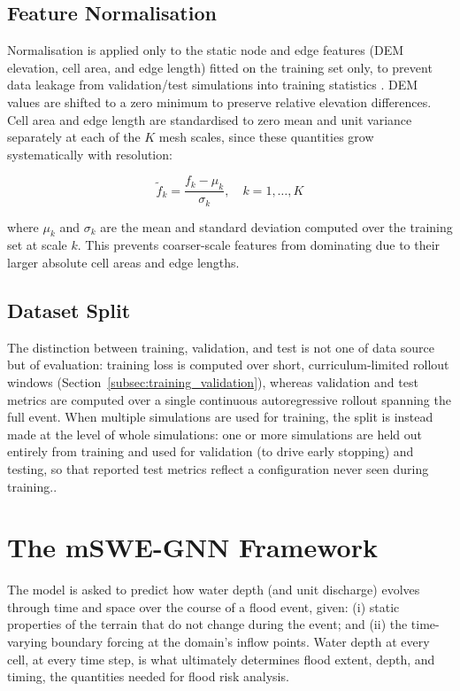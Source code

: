 \documentclass[12pt,a4paper]{report}
\begin{document}
\subsection{Feature Normalisation}
\label{subsec:normalisation}

Normalisation is applied only to the static node and edge features (DEM
elevation, cell area, and edge length) fitted on the training set only, to
prevent data leakage from validation/test simulations into training statistics
\citep{sasse2023leakage}. DEM values are shifted to a zero minimum to preserve
relative elevation differences. Cell area and edge length are standardised to
zero mean and unit variance separately at each of the $K$ mesh scales, since
these quantities grow systematically with resolution:

\begin{equation}
    \tilde{f}_k = \frac{f_k - \mu_k}{\sigma_k}, \quad k = 1, \dots, K
    \label{eq:scale_norm}
\end{equation}

where $\mu_k$ and $\sigma_k$ are the mean and standard deviation computed over the
training set at scale $k$. This prevents coarser-scale features from dominating due
to their larger absolute cell areas and edge lengths.
 
\subsection{Dataset Split}
\label{subsec:temporal_resolution}

The distinction between training, validation, and test is not one of data source but
of evaluation: training loss is computed over short, curriculum-limited rollout
windows (Section~\ref{subsec:training_validation}), whereas validation and test metrics are
computed over a single continuous autoregressive rollout spanning the full event.
When multiple simulations are used for training, the split is instead made at the
level of whole simulations: one or more simulations are held out entirely from
training and used for validation (to drive early stopping) and testing, so that
reported test metrics reflect a configuration never seen during training..

\section{The mSWE-GNN Framework}
\label{sec:mswe_gnn}

The model is asked to predict how water depth (and unit discharge) evolves through
time and space over the course of a flood event, given: (i) static properties of the
terrain that do not change during the event; and (ii) the time-varying boundary
forcing at the domain's inflow points. Water depth at every cell, at every time step,
is what ultimately determines flood extent, depth, and timing, the quantities needed
for flood risk analysis.
 
\end{document}
